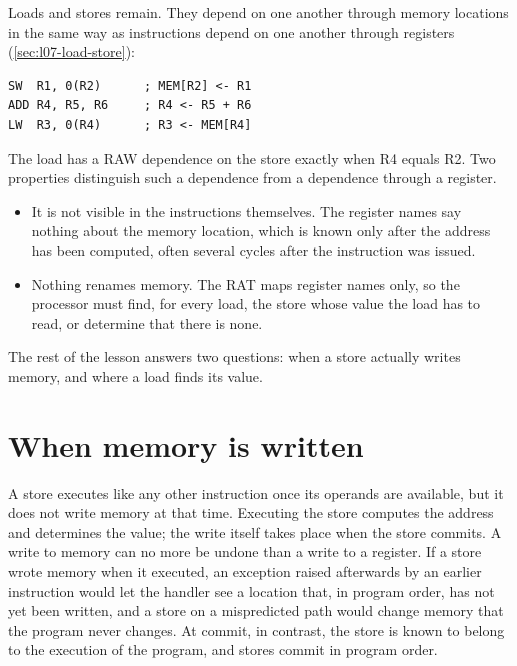 \documentclass[../main.tex]{subfiles}
\begin{document}
Loads and stores remain.  They depend on one
another through memory locations in the same way as instructions depend on one
another through registers
(\cref{sec:l07-load-store}):
\begin{lstlisting}[language={[x86masm]Assembler}, numbers=none]
SW  R1, 0(R2)      ; MEM[R2] <- R1
ADD R4, R5, R6     ; R4 <- R5 + R6
LW  R3, 0(R4)      ; R3 <- MEM[R4]
\end{lstlisting}
The load has a RAW dependence on the store exactly when R4 equals
R2.  Two
properties distinguish such a dependence from a dependence through a register.
\begin{itemize}
  \item It is not visible in the instructions themselves.  The register names
    say nothing about the memory location, which is known only after the
    address has been computed, often several cycles after the instruction was
    issued.
  \item Nothing renames memory.  The RAT maps register names only, so the
    processor must find, for every load, the store whose value the load has to
    read, or determine that there is none.
\end{itemize}
The rest of the lesson answers two questions: when a store actually writes
memory, and where a load finds its value.

\section{When memory is written}
\label{sec:l09-write}

A store executes like any other instruction once its operands are available,
but it does not write memory at that time.  Executing the store computes the address and determines the value; the
write itself takes place when the store commits.  A write to memory can no more
be undone than a write to a register.  If a store wrote memory when it
executed, an exception raised afterwards by an earlier instruction would let
the handler see a location that, in program order, has not yet been written,
and a store on a mispredicted path would change memory that the program never
changes.  At commit, in contrast, the store is known to belong to the
execution of the program, and stores commit in program order.
\end{document}
